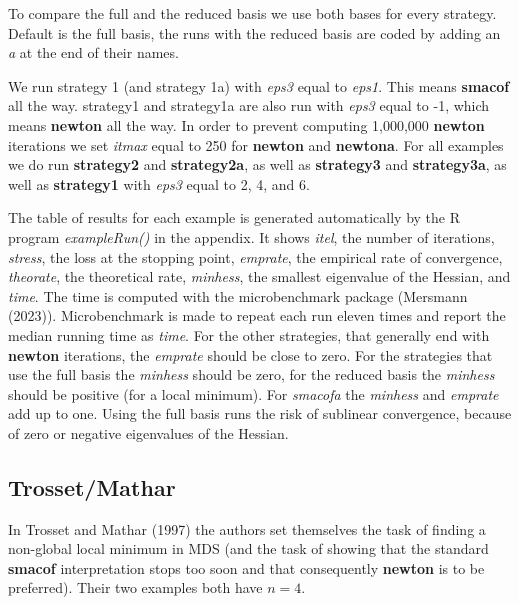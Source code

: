 \documentclass[
  12pt,
]{article}
\begin{document}
To compare the full and the reduced basis we use both bases for every strategy.
Default is the full basis, the runs with the reduced basis are coded
by adding an \emph{a} at the end of their names.

We run strategy 1 (and strategy 1a) with \emph{eps3} equal to \emph{eps1}. This means \textbf{smacof} all the way. strategy1 and strategy1a are also run with \emph{eps3} equal to -1, which
means \textbf{newton} all the way. In order to prevent computing 1,000,000 \textbf{newton} iterations we set
\emph{itmax} equal to 250 for \textbf{newton} and \textbf{newtona}.
For all examples we do run \textbf{strategy2} and \textbf{strategy2a}, as well as \textbf{strategy3} and \textbf{strategy3a}, as well as \textbf{strategy1} with \emph{eps3} equal to 2, 4, and 6.

The table of results for each example is generated automatically by the R program \emph{exampleRun()}
in the appendix. It shows \emph{itel}, the number of iterations, \emph{stress}, the loss
at the stopping point, \emph{emprate}, the empirical rate of convergence,
\emph{theorate}, the theoretical rate, \emph{minhess}, the smallest eigenvalue of
the Hessian, and \emph{time}. The time is computed with the microbenchmark
package (Mersmann (2023)). Microbenchmark is made to repeat each run eleven times and report the
median running time as \emph{time}. For the other strategies, that
generally end with \textbf{newton} iterations, the \emph{emprate} should be
close to zero.
For the strategies that use the full basis the \emph{minhess} should be zero,
for the reduced basis the \emph{minhess} should be positive (for a local
minimum). For \emph{smacofa} the \emph{minhess} and \emph{emprate} add up to one.
Using the full basis runs the risk of sublinear convergence,
because of zero or negative eigenvalues of the Hessian.

\subsection{Trosset/Mathar}\label{trossetmathar}

In Trosset and Mathar (1997) the authors set themselves the task of finding a non-global
local minimum in MDS (and the task of showing that the standard \textbf{smacof}
interpretation stops too soon and that consequently \textbf{newton} is to be preferred).
Their two examples both have \(n=4\).
\end{document}
